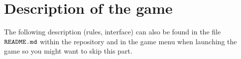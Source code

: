 \documentclass{article}
\newcommand{\vect}[1]{\boldsymbol{#1}}
\begin{document}
\clearpage

\tableofcontents






\clearpage

\section{Description of the game}

The following description (rules, interface) can also be found in the file $\verb|README.md|$ within the repository and in the game menu when launching the game so you might want to skip this part.
\end{document}
